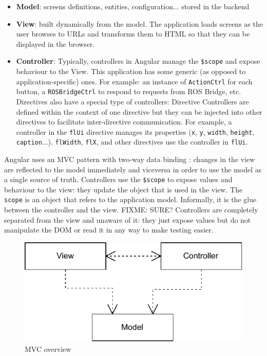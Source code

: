\begin{itemize}
    \item \textbf{Model}: screens definitions, entities, configuration... stored in the backend
    \item \textbf{View}: built dynamically from the model. The application loads screens as the user browses to \ac{URL}s and transforms them to \ac{HTML} so that they can be displayed in the browser.
    \item \textbf{Controller}: Typically, controllers in Angular manage the \texttt{\$scope} and expose behaviour to the View. This application has some generic (as opposed to application-specific) ones. For example: an instance of \texttt{ActionCtrl} for each button, a \texttt{ROSBridgeCtrl} to respond to requests from ROS Bridge, etc. Directives also have a special type of controllers: Directive Controllers are defined within the context of one directive but they can be injected into other directives to facilitate inter-directive communication. For example, a controller in the \texttt{flUi} directive manages its properties (\texttt{x}, \texttt{y}, \texttt{width}, \texttt{height}, \texttt{caption}...). \texttt{flWidth}, \texttt{flX}, and other directives use the controller in \texttt{flUi}.
\end{itemize}

Angular uses an \ac{MVC} pattern with two-way data binding : changes in the view are reflected to the model immediately and viceversa in order to use the model as a single source of truth.
Controllers use the \texttt{\$scope} to expose values and behaviour to the view: they update the object that is used in the view.
The \texttt{scope} is an object that refers to the application model.
Informally, it is the glue between the controller and the view.
FIXME: SURE? Controllers are completely separated from the view and unaware of it: they just expose values but do not manipulate the \ac{DOM} or read it in any way to make testing easier.

\begin{figure}[htb]
    \centering
    \includegraphics{figures/design-patterns-mvc-1.pdf}
    \caption{MVC overview}
    \label{fig:mvc-overview}
\end{figure}

